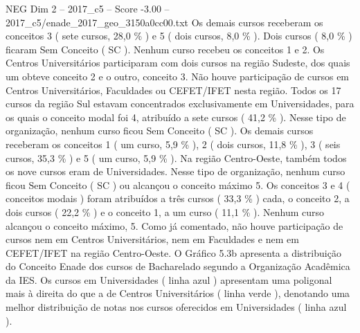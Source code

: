 \begin{textsample}{NEG Dim 2 – 2017\_c5 – Score -3.00 – 2017\_c5/enade\_2017\_geo\_3150a0cc00.txt}
Os demais cursos receberam os conceitos 3 ( sete cursos, 28,0 \% ) e 5 ( dois cursos, 8,0 \% ).
Dois cursos ( 8,0 \% ) ficaram Sem Conceito ( SC ).
Nenhum curso recebeu os conceitos 1 e 2.
Os Centros Universitários participaram com dois cursos na região Sudeste, dos quais um obteve conceito 2 e o outro, conceito 3.
Não houve participação de cursos em Centros Universitários, Faculdades ou CEFET/IFET nesta região.
Todos os 17 cursos da região Sul estavam concentrados exclusivamente em Universidades, para os quais o conceito modal foi 4, atribuído a sete cursos ( 41,2 \% ).
Nesse tipo de organização, nenhum curso ficou Sem Conceito ( SC ).
Os demais cursos receberam os conceitos 1 ( um curso, 5,9 \% ), 2 ( dois cursos, 11,8 \% ), 3 ( seis cursos, 35,3 \% ) e 5 ( um curso, 5,9 \% ).
Na região Centro-Oeste, também todos os nove cursos eram de Universidades.
Nesse tipo de organização, nenhum curso ficou Sem Conceito ( SC ) ou alcançou o conceito máximo 5.
Os conceitos 3 e 4 ( conceitos modais ) foram atribuídos a três cursos ( 33,3 \% ) cada, o conceito 2, a dois cursos ( 22,2 \% ) e o conceito 1, a um curso ( 11,1 \% ).
Nenhum curso alcançou o conceito máximo, 5.
Como já comentado, não houve participação de cursos nem em Centros Universitários, nem em Faculdades e nem em CEFET/IFET na região Centro-Oeste.
O Gráfico 5.3b apresenta a distribuição do Conceito Enade dos cursos de Bacharelado segundo a Organização Acadêmica da IES.
Os cursos em Universidades ( linha azul ) apresentam uma poligonal mais à direita do que a de Centros Universitários ( linha verde ), denotando uma melhor distribuição de notas nos cursos oferecidos em Universidades ( linha azul ).

\end{textsample}
